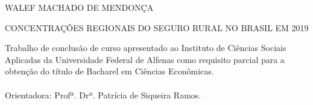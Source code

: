 \documentclass[
	12pt,				%
	openright,			%
	oneside,			%
	a4paper,			%
	chapter=TITLE,		%
	section=TITLE,		%
	english,			%
	french,				%
	spanish,			%
	brazil				%
	]{abntex2}
\begin{document}
\vspace{3.2cm}
\thispagestyle{empty}
\begin{center}
    \normalsize {WALEF MACHADO DE MENDONÇA}
\end{center}
\vspace{4.3cm}
\begin{center}
    \normalsize {CONCENTRAÇÕES REGIONAIS DO SEGURO RURAL NO BRASIL EM 2019}
\end{center}
\vspace{3.5cm}
\begin{flushright}
\parbox[t]{8cm}{
\begin{singlespace}
{
\fontsize{11pt}{\baselineskip}\selectfont
Trabalho de conclusão de curso apresentado ao Instituto de Ciências Sociais Aplicadas da Universidade Federal de Alfenas como requisito parcial para a obtenção do título de Bacharel em Ciências Econômicas.\\
 \\
 Orientadora: Profª. Drª. Patrícia de Siqueira Ramos.\\
}
\end{singlespace}
}
\end{flushright}
\vspace{6cm}
\begin{center}
\normalsize{}
\end{center}






%
\begin{fichacatalografica}
     
\end{fichacatalografica}
\end{document}
